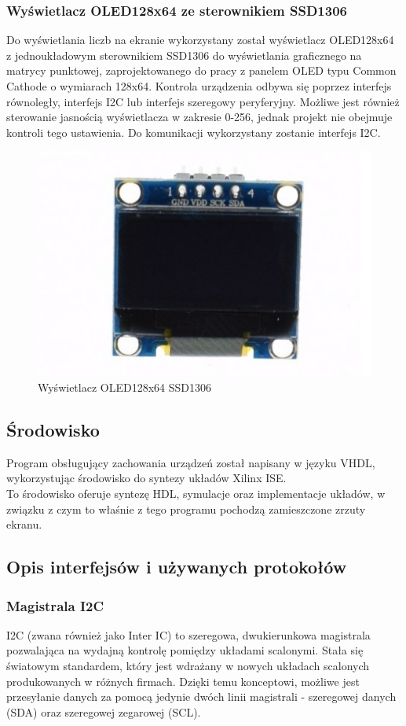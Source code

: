 \documentclass[]{article}
\begin{document}
	\subsubsection{Wyświetlacz OLED128x64 ze sterownikiem SSD1306}
	Do wyświetlania liczb na ekranie wykorzystany został wyświetlacz OLED128x64 z jednoukładowym sterownikiem SSD1306 do wyświetlania graficznego na matrycy punktowej, zaprojektowanego do pracy z panelem OLED typu Common Cathode o wymiarach 128x64. Kontrola urządzenia odbywa się poprzez interfejs równoległy, interfejs I2C lub interfejs szeregowy peryferyjny. Możliwe jest również sterowanie jasnością wyświetlacza w zakresie 0-256, jednak projekt nie obejmuje kontroli tego ustawienia. Do komunikacji wykorzystany zostanie interfejs I2C. \cite{oled}
	\begin{figure}[H]
		\includegraphics[width=.3\linewidth]{img/oled.jpg}
		\centering
		\caption{Wyświetlacz OLED128x64 SSD1306}
		\label{fig:oled}
	\end{figure}
	
	\subsection{Środowisko}
	Program obsługujący zachowania urządzeń został napisany w języku VHDL, wykorzystując środowisko do syntezy układów Xilinx ISE. \\
	To środowisko oferuje syntezę HDL, symulacje oraz implementacje układów, w związku z czym to właśnie z tego programu pochodzą zamieszczone zrzuty ekranu.

	\subsection{Opis interfejsów i używanych protokołów}
	\subsubsection{Magistrala I2C}
	I2C (zwana również jako Inter IC) to szeregowa, dwukierunkowa magistrala pozwalająca na wydajną kontrolę pomiędzy układami scalonymi. Stała się światowym standardem, który jest wdrażany w nowych układach scalonych produkowanych w różnych firmach. Dzięki temu konceptowi, możliwe jest przesyłanie danych za pomocą jedynie dwóch linii magistrali - szeregowej danych (SDA) oraz szeregowej zegarowej (SCL). \cite{i2c}
\end{document}
